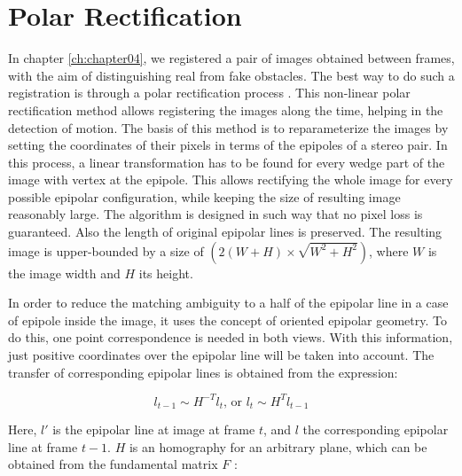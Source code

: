 
\graphicspath{{./images/chapter04/bmps/}{./images/chapter04/vects/}{./images/chapter04/}}

\chapter{Polar Rectification}\label{ch:appendix_polar_calib}

In chapter \ref{ch:chapter04}, we registered a pair of images obtained between frames, with the aim of distinguishing real from fake obstacles. The best way to do such a registration is through a polar rectification process \citep{pollefeys1999simple}. This non-linear polar rectification method allows registering the images along the time, helping in the detection of motion. The basis of this method is to reparameterize the images by setting the coordinates of their pixels in terms of the epipoles of a stereo pair. In this process, a linear transformation has to be found for every wedge part of the image with vertex at the epipole. This allows rectifying the whole image for every possible epipolar configuration, while keeping the size of resulting image reasonably large. The algorithm is designed in such way that no pixel loss is guaranteed. Also the length of original epipolar lines is preserved. The resulting image is upper-bounded by a size of $(2 (W + H) \times \sqrt{W^2 + H^2})$, where $W$ is the image width and $H$ its height. 

In order to reduce the matching ambiguity to a half of the epipolar line in a case of epipole inside the image, it uses the concept of oriented epipolar geometry. To do this, one point correspondence is needed in both views. With this information, just positive coordinates over the epipolar line will be taken into account. The transfer of corresponding epipolar lines is obtained from the expression:

\begin{equation}\label{eq:cp04_epipolar_lines}
l_{t - 1} \sim H^{-T}l_t\text{, or }l_t \sim H^T l_{t - 1}
\end{equation}

Here, $l'$ is the epipolar line at image at frame $t$, and $l$ the corresponding epipolar line at frame $t - 1$. $H$ is an homography for an arbitrary plane, which can be obtained from the fundamental matrix $F$ \citep{luong1996fundamental}:

